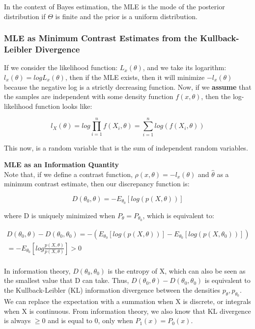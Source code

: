 		In the context of Bayes estimation, the MLE is the mode of the posterior distribution if $\Theta$ is finite and the prior is a uniform distribution.

		\subsubsection{MLE as Minimum Contrast Estimates from the Kullback-Leibler Divergence}

			If we consider the likelihood function: $L_x(\theta)$, and we take its logarithm: $l_x(\theta) = log L_x(\theta)$, then if the MLE exists, then it will minimize $-l_x(\theta)$ because the negative log is a strictly decreasing function. Now, if we \textbf{assume} that the samples are independent with some density function $f(x, \theta)$, then the log-likelihood function looks like:

			$$l_X(\theta) = log \prod_{i=1}^n f(X_i, \theta) = \sum_{i=1}^n log( f(X_i, \theta) )$$

			This now, is a random variable that is the sum of independent random variables.

			\textbf{MLE as an Information Quantity}\\
			Note that, if we define a contrast function, $\rho(x, \theta) = -l_x(\theta)$ and $\hat{\theta}$ as a minimum contrast estimate, then our discrepancy function is:

			$$D(\theta_0, \theta) = - E_{\theta_0} [ log(p(X, \theta)) ]$$

			where D is uniquely minimized when $P_\theta = P_{\theta_0}$, which is equivalent to:

			\begin{align}
				D(\theta_0, \theta) - D(\theta_0, \theta_0) = - (E_{\theta_0}[ log(p(X, \theta))] - E_{\theta_0}[ log(p(X, \theta_0))] )\\
					= -E_{\theta_0} [ log \frac{p(X, \theta)}{p(X, \theta)} ] > 0 \\
			\end{align}

			In information theory, $D(\theta_0, \theta_0)$ is the entropy of X, which can also be seen as the smallest value that D can take. Thus, $D(\theta_0, \theta) - D(\theta_0, \theta_0)$ is equivalent to the Kullback-Leibler (KL) information divergence between the densities $p_\theta, p_{\theta_0}$. We can replace the expectation with a summation when X is discrete, or integrals when X is continuous. From information theory, we also know that KL divergence is always $\ge 0$ and is equal to 0, only when $P_1(x) = P_0(x)$. 

